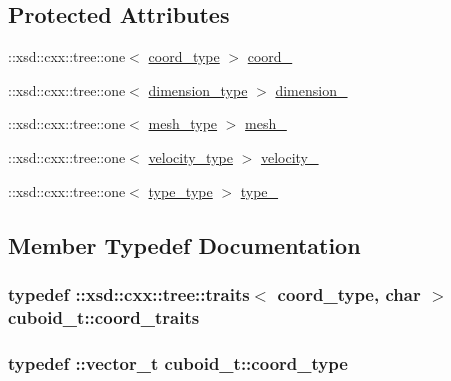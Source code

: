 \subsection*{Protected Attributes}
\begin{DoxyCompactItemize}
\item 
\+::xsd\+::cxx\+::tree\+::one$<$ \hyperlink{classcuboid__t_aa3c19ea94c59ed982641ca39a420a041}{coord\+\_\+type} $>$ \hyperlink{classcuboid__t_ac230bff6b6def0f5d6aabaacc3538d38}{coord\+\_\+}
\item 
\+::xsd\+::cxx\+::tree\+::one$<$ \hyperlink{classcuboid__t_a0992ec1724eb71e76babf752bbe9189b}{dimension\+\_\+type} $>$ \hyperlink{classcuboid__t_a12a329c151427b69ab165a23ce32ed26}{dimension\+\_\+}
\item 
\+::xsd\+::cxx\+::tree\+::one$<$ \hyperlink{classcuboid__t_a48025da79e9243b8b1e34e696c22e06d}{mesh\+\_\+type} $>$ \hyperlink{classcuboid__t_aaac49c075536283060216167d0e71e80}{mesh\+\_\+}
\item 
\+::xsd\+::cxx\+::tree\+::one$<$ \hyperlink{classcuboid__t_a71c58ac42113feacf576245bc43d8dde}{velocity\+\_\+type} $>$ \hyperlink{classcuboid__t_a38590de341c9a52a3cced988ea26d891}{velocity\+\_\+}
\item 
\+::xsd\+::cxx\+::tree\+::one$<$ \hyperlink{classcuboid__t_a6fb75392e8d31d56062e18b6aa2adc8a}{type\+\_\+type} $>$ \hyperlink{classcuboid__t_a950799bbd14b31cd020481cba9092eb8}{type\+\_\+}
\end{DoxyCompactItemize}


\subsection{Member Typedef Documentation}
\subsubsection[{\texorpdfstring{coord\+\_\+traits}{coord_traits}}]{\setlength{\rightskip}{0pt plus 5cm}typedef \+::xsd\+::cxx\+::tree\+::traits$<$ {\bf coord\+\_\+type}, char $>$ {\bf cuboid\+\_\+t\+::coord\+\_\+traits}}\hypertarget{classcuboid__t_a9aa6a75493e47a7f976c08e9be597b54}{}\label{classcuboid__t_a9aa6a75493e47a7f976c08e9be597b54}
\subsubsection[{\texorpdfstring{coord\+\_\+type}{coord_type}}]{\setlength{\rightskip}{0pt plus 5cm}typedef \+::{\bf vector\+\_\+t} {\bf cuboid\+\_\+t\+::coord\+\_\+type}}\hypertarget{classcuboid__t_aa3c19ea94c59ed982641ca39a420a041}{}\label{classcuboid__t_aa3c19ea94c59ed982641ca39a420a041}

